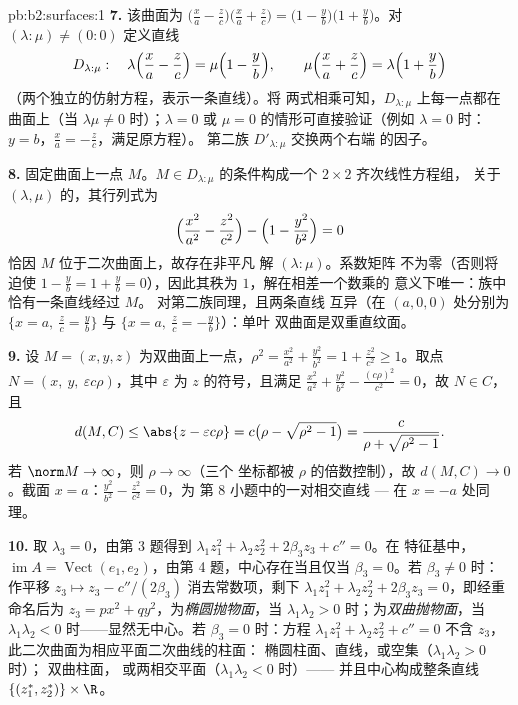 \begin{solution}{pb:b2:surfaces:1}
\textbf{7.} 该曲面为 $\bigl(\frac xa - \frac
zc\bigr)\bigl(\frac xa + \frac zc\bigr) = \bigl(1 - \frac
yb\bigr)\bigl(1 + \frac yb\bigr)$。对 $(\lambda : \mu) \neq
(0:0)$ 定义直线
\[
D_{\lambda:\mu} :\quad
\lambda\Bigl(\frac xa - \frac zc\Bigr) = \mu\Bigl(1 - \frac
yb\Bigr), \qquad
\mu\Bigl(\frac xa + \frac zc\Bigr) = \lambda\Bigl(1 + \frac
yb\Bigr)
\]
（两个独立的仿射方程，表示一条直线）。将
两式相乘可知，$D_{\lambda:\mu}$ 上每一点都在
曲面上（当 $\lambda\mu \neq 0$ 时）；$\lambda = 0$
或 $\mu = 0$ 的情形可直接验证（例如 $\lambda = 0$ 时：$y =
b$，$\frac xa = -\frac zc$，满足原方程）。
第二族 $D'_{\lambda:\mu}$ 交换两个右端
的因子。

\textbf{8.} 固定曲面上一点 $M$。$M \in
D_{\lambda:\mu}$ 的条件构成一个 $2\times2$ 齐次线性方程组，
关于 $(\lambda, \mu)$ 的，其行列式为
\[
\Bigl(\frac{x^2}{a^2} - \frac{z^2}{c^2}\Bigr) - \Bigl(1 -
\frac{y^2}{b^2}\Bigr) = 0
\]
恰因 $M$ 位于二次曲面上，故存在非平凡
解 $(\lambda : \mu)$。系数矩阵
不为零（否则将迫使 $1 - \frac yb = 1 + \frac yb =
0$），因此其秩为 $1$，解在相差一个数乘的
意义下唯一：族中恰有一条直线经过 $M$。
对第二族同理，且两条直线
互异（在 $(a, 0, 0)$ 处分别为 $\{x = a,\ \frac zc = \frac
yb\}$ 与 $\{x = a,\ \frac zc = -\frac yb\}$）：单叶
双曲面是双重直纹面。

\textbf{9.} 设 $M = (x, y, z)$ 为双曲面上一点，$\rho^2 =
\frac{x^2}{a^2} + \frac{y^2}{b^2} = 1 + \frac{z^2}{c^2} \geq
1$。取点 $N = (x,\ y,\ \varepsilon c\rho)$，其中
$\varepsilon$ 为 $z$ 的符号，且满足 $\frac{x^2}{a^2} +
\frac{y^2}{b^2} - \frac{(c\rho)^2}{c^2} = 0$，故 $N \in C$，且
\[
d(M, C) \leq \abs{z - \varepsilon c\rho}
= c\bigl(\rho - \sqrt{\rho^2 - 1}\bigr)
= \frac{c}{\rho + \sqrt{\rho^2 - 1}} .
\]
若 $\norm M \to \infty$，则 $\rho \to \infty$（三个
坐标都被 $\rho$ 的倍数控制），故 $d(M, C)
\to 0$。截面 $x = a$：$\frac{y^2}{b^2} -
\frac{z^2}{c^2} = 0$，为
第 8 小题中的一对相交直线 --- 在 $x = -a$ 处同理。

\textbf{10.} 取 $\lambda_3 = 0$，由第 3 题得到
$\lambda_1z_1^2 + \lambda_2z_2^2 + 2\beta_3z_3 + c'' = 0$。在
特征基中，$\operatorname{im}A = \operatorname{Vect}(e_1,
e_2)$，由第 4 题，中心存在当且仅当 $\beta_3 = 0$。若
$\beta_3 \neq 0$ 时：作平移 $z_3 \mapsto z_3 -
c''/(2\beta_3)$ 消去常数项，剩下 $\lambda_1z_1^2
+ \lambda_2z_2^2 + 2\beta_3z_3 = 0$，即经重命名后为 $z_3 = px^2 +
qy^2$，为\emph{椭圆抛物面}，当
$\lambda_1\lambda_2 > 0$ 时；为\emph{双曲抛物面}，当
$\lambda_1\lambda_2 < 0$ 时——显然无中心。若
$\beta_3 = 0$ 时：方程 $\lambda_1z_1^2 + \lambda_2z_2^2 +
c'' = 0$ 不含 $z_3$，此二次曲面为相应平面二次曲线的柱面：
椭圆柱面、直线，或空集（$\lambda_1\lambda_2 > 0$ 时）；
双曲柱面，
或两相交平面（$\lambda_1\lambda_2 < 0$ 时）——
并且中心构成整条直线
$\{(z_1^*, z_2^*)\} \times \R$。


\end{solution}
